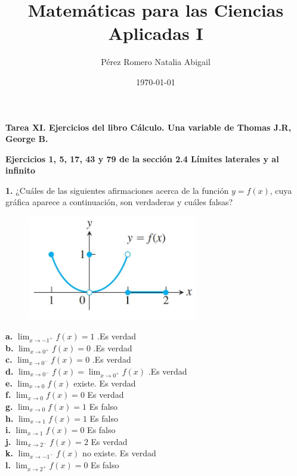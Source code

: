 \documentclass[12pt, letterpaper]{article}
\title{Matemáticas para las Ciencias Aplicadas I}
\author{Pérez Romero Natalia Abigail}
\date{\today}
\begin{document}
\maketitle
\textbf{Tarea XI. Ejercicios del libro Cálculo. Una variable de Thomas J.R, George B.}

\textbf{Ejercicios 1, 5, 17, 43 y 79 de  la sección 2.4 Límites laterales y al infinito}

\textbf{1.} ¿Cuáles de las siguientes afirmaciones acerca de la función $y = f(x)$, cuya gráfica aparece a continuación, son verdaderas y cuáles falsas?\\


\begin{figure}[tbh]
\centering
\includegraphics[width=20em]{t11uno}
\end{figure}

\textbf{a.} $\lim_{ x \to -1^+} f(x) = 1$ .Es verdad\\
\textbf{b.} $\lim_{ x \to 0^+} f(x) = 0$ .Es verdad\\
\textbf{c.} $\lim_{ x \to 0^-} f(x) = 0$ .Es verdad\\
\textbf{d.} $\lim_{ x \to 0^-} f(x) =  \lim_{ x \to 0^+} f(x)$ .Es verdad\\
\textbf{e.} $\lim_{ x \to 0} f(x)$ existe. Es verdad\\
\textbf{f.} $\lim_{ x \to 0} f(x) = 0$ Es verdad\\
\textbf{g.} $\lim_{ x \to 0} f(x) = 1$ Es falso\\
\textbf{h.} $\lim_{ x \to 1} f(x) = 1$ Es falso\\
\textbf{i.} $\lim_{ x \to 1} f(x) = 0$ Es falso\\
\textbf{j.} $\lim_{ x \to 2^-} f(x) = 2$ Es verdad\\
\textbf{k.} $\lim_{ x \to -1^-} f(x) $ no existe. Es verdad\\
\textbf{l.} $\lim_{ x \to 2^+} f(x) = 0$ Es falso\\
\end{document}
